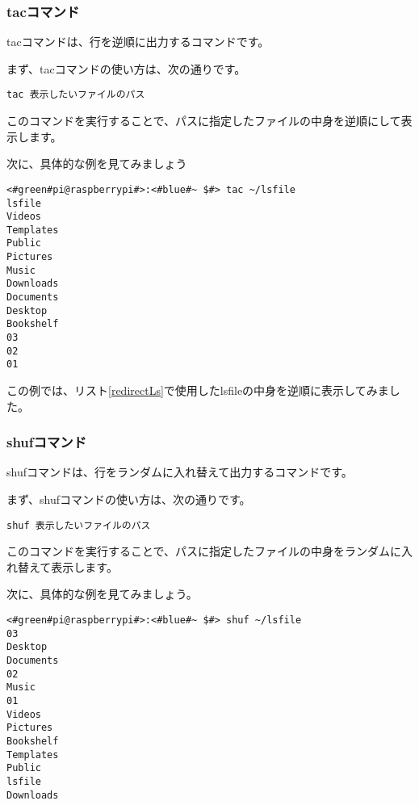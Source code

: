 \subsubsection{tacコマンド}
tacコマンドは、行を逆順に出力するコマンドです。

まず、tacコマンドの使い方は、次の通りです。

\begin{lstlisting}[caption=tacコマンドの使い方, label=tac_usage]
tac 表示したいファイルのパス
\end{lstlisting}

このコマンドを実行することで、パスに指定したファイルの中身を逆順にして表示します。

次に、具体的な例を見てみましょう

\begin{lstlisting}[caption=tacコマンドの実行例, label=tac_example]
<#green#pi@raspberrypi#>:<#blue#~ $#> tac ~/lsfile
lsfile
Videos
Templates
Public
Pictures
Music
Downloads
Documents
Desktop
Bookshelf
03
02
01 
\end{lstlisting}

この例では、リスト\ref{redirectLs}で使用したlsfileの中身を逆順に表示してみました。

\begin{tcolorbox}[title=\useOmetoi]
    \begin{enumerate}
    \end{enumerate}
\end{tcolorbox}

\subsubsection{shufコマンド}
shufコマンドは、行をランダムに入れ替えて出力するコマンドです。

まず、shufコマンドの使い方は、次の通りです。

\begin{lstlisting}[caption=shufコマンドの使い方, label=shuf_usage]
shuf 表示したいファイルのパス
\end{lstlisting}

このコマンドを実行することで、パスに指定したファイルの中身をランダムに入れ替えて表示します。

次に、具体的な例を見てみましょう。

\begin{lstlisting}[caption=shufコマンドの実行例, label=shuf_example]
<#green#pi@raspberrypi#>:<#blue#~ $#> shuf ~/lsfile
03
Desktop
Documents
02
Music
01
Videos
Pictures
Bookshelf
Templates
Public
lsfile
Downloads
\end{lstlisting}

